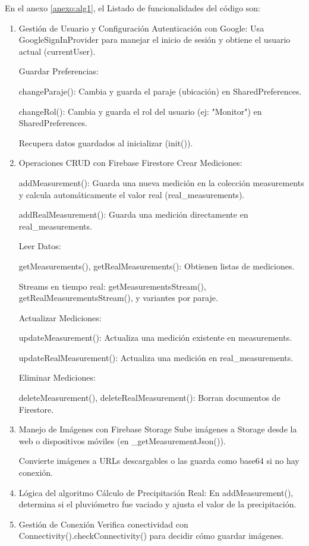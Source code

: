 En el anexo \ref{anexo:alg1}, el Listado de funcionalidades del código son:
\begin{enumerate}
    \item Gestión de Usuario y Configuración
    Autenticación con Google: Usa GoogleSignInProvider para manejar el inicio de sesión y obtiene el usuario actual (currentUser).
    
    Guardar Preferencias:
    
    changeParaje(): Cambia y guarda el paraje (ubicación) en SharedPreferences.
    
    changeRol(): Cambia y guarda el rol del usuario (ej: "Monitor") en SharedPreferences.
    
    Recupera datos guardados al inicializar (init()).
    
    \item Operaciones CRUD con Firebase Firestore
    Crear Mediciones:
    
    addMeasurement(): Guarda una nueva medición en la colección measurements y calcula automáticamente el valor real (real\_measurements).
    
    addRealMeasurement(): Guarda una medición directamente en real\_measurements.
    
    Leer Datos:
    
    getMeasurements(), getRealMeasurements(): Obtienen listas de mediciones.
    
    Streams en tiempo real: getMeasurementsStream(), getRealMeasurementsStream(), y variantes por paraje.
    
    Actualizar Mediciones:
    
    updateMeasurement(): Actualiza una medición existente en measurements.
    
    updateRealMeasurement(): Actualiza una medición en real\_measurements.
    
    Eliminar Mediciones:
    
    deleteMeasurement(), deleteRealMeasurement(): Borran documentos de Firestore.
    
    \item Manejo de Imágenes con Firebase Storage
    Sube imágenes a Storage desde la web o dispositivos móviles (en \_getMeasurementJson()).
    
    Convierte imágenes a URLs descargables o las guarda como base64 si no hay conexión.
    
    \item Lógica del algoritmo
    Cálculo de Precipitación Real: En addMeasurement(), determina si el pluviómetro fue vaciado y ajusta el valor de la precipitación.
    
    \item Gestión de Conexión
    Verifica conectividad con Connectivity().checkConnectivity() para decidir cómo guardar imágenes.
    
\end{enumerate}

